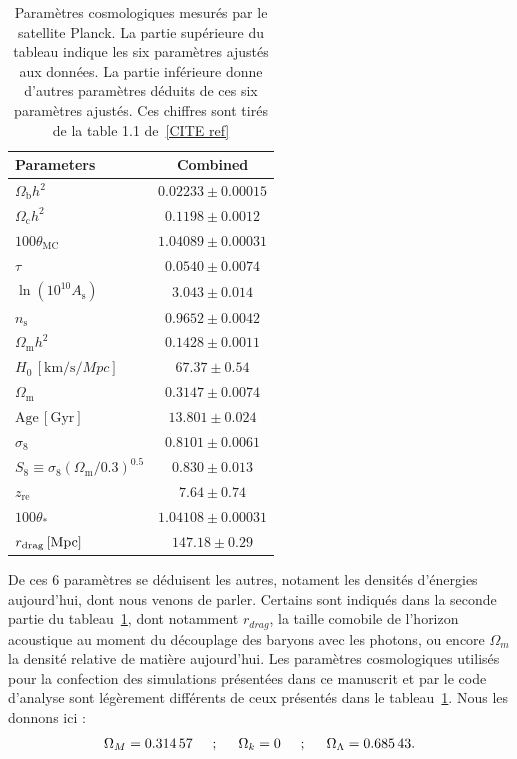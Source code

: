 \documentclass[11pt, twoside, a4paper, openright]{report}
\begin{document}
\begin{table}[h]
  \centering
  \caption{Paramètres cosmologiques mesurés par le satellite Planck. La partie supérieure du tableau indique les six paramètres ajustés aux données. La partie inférieure donne d'autres paramètres déduits de ces six paramètres ajustés. Ces chiffres sont tirés de la table 1.1 de~\ref{CITE ref}}
  \label{table:planck2018}
  \begin{tabular}{lc}
    \toprule
    Parameters & Combined \\
    \midrule
    $\Omega_{\mathrm{b}}h^2$\dotfill & $0.02233\pm0.00015$ \\
    $\Omega_{\mathrm{c}}h^2$\dotfill & $0.1198\pm0.0012$ \\
    $100\theta_{\mathrm{MC}}$\dotfill & $1.04089\pm0.00031$ \\
    $\tau$\dotfill & $0.0540\pm0.0074$ \\
    $\ln(10^{10}A_\mathrm{s})$\dotfill & $3.043\pm0.014$ \\
    $n_\mathrm{s}$\dotfill & $0.9652\pm0.0042$ \\
    \midrule
    $\Omega_{\mathrm{m}} h^2$\dotfill & $ 0.1428\pm 0.0011 $ \\
    $H_0 \,[\si{\kilo\meter\per\second\per Mpc}]$\dotfill & $67.37\pm0.54$ \\
    $\Omega_{\mathrm{m}}$\dotfill & $0.3147\pm0.0074$ \\
    $\mathrm{Age}\, [\mathrm{Gyr}]$\dotfill  & $13.801\pm0.024$ \\
    $\sigma_8$\dotfill & $0.8101\pm0.0061$ \\
    $S_8\equiv \sigma_8 (\Omega_{\mathrm{m}}/0.3)^{0.5}$\dotfill & $0.830\pm0.013$ \\
    $z_{\mathrm{re}}$\dotfill & $7.64\pm0.74$ \\
    $100\theta_\ast$\dotfill & $1.04108\pm0.00031$ \\
    $r_{\mathrm{drag}} \,[{\rm Mpc}]$\dotfill & $147.18\pm0.29$ \\
    \bottomrule
  \end{tabular}
\end{table}

De ces 6 paramètres se déduisent les autres, notament les densités d'énergies aujourd'hui, dont nous venons de parler. Certains sont indiqués dans la seconde partie du tableau~\ref{table:planck2018},
dont notamment $r_{drag}$, la taille comobile de l'horizon acoustique au moment du découplage des baryons avec les photons,
ou encore $\Omega_m$ la densité relative de matière aujourd'hui. Les paramètres cosmologiques utilisés pour la confection des simulations présentées dans ce manuscrit et par le code d'analyse \picca{} sont légèrement différents de ceux présentés dans le tableau~\ref{table:planck2018}. Nous les donnons ici :
\begin{equation}
  \label{eq:par_cosmo}
  \Omega_M = \num{0.31457} \hspace{0.5cm} ; \hspace{0.5cm} \Omega_k = \num{0} \hspace{0.5cm} ; \hspace{0.5cm} \Omega_{\Lambda} = \num{0.68543} .
\end{equation}
\end{document}
